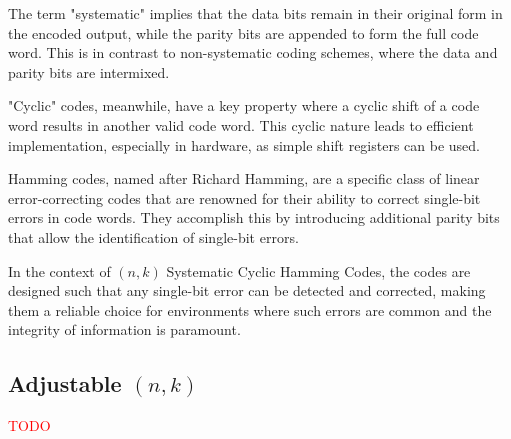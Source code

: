 \documentclass{article}
\begin{document}
The term "systematic" implies that the data bits remain in their original form in the encoded output, while the parity bits are appended to form the full code word. This is in contrast to non-systematic coding schemes, where the data and parity bits are intermixed.

"Cyclic" codes, meanwhile, have a key property where a cyclic shift of a code word results in another valid code word. This cyclic nature leads to efficient implementation, especially in hardware, as simple shift registers can be used.

Hamming codes, named after Richard Hamming, are a specific class of linear error-correcting codes that are renowned for their ability to correct single-bit errors in code words. They accomplish this by introducing additional parity bits that allow the identification of single-bit errors.

In the context of $(n,k)$ Systematic Cyclic Hamming Codes, the codes are designed such that any single-bit error can be detected and corrected, making them a reliable choice for environments where such errors are common and the integrity of information is paramount.


\subsection{Adjustable $(n,k)$}
\label{sec:adjustable-nk}
\textcolor{red}{TODO}
\end{document}
